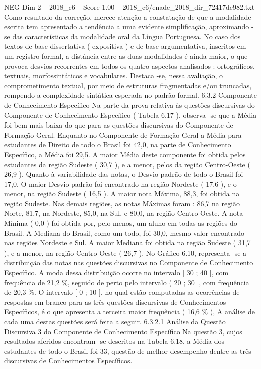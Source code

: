 \begin{textsample}{NEG Dim 2 – 2018\_c6 – Score 1.00 – 2018\_c6/enade\_2018\_dir\_72417de982.txt}
Como resultado da correção, merece atenção a constatação de que a modalidade escrita tem apresentado a tendência a uma evidente simplificação, aproximando -se das características da modalidade oral da Língua Portuguesa.
No caso dos textos de base dissertativa ( expositiva ) e de base argumentativa, inscritos em um registro formal, a distância entre as duas modalidades é ainda maior, o que provoca desvios recorrentes em todos os quatro aspectos analisados : ortográficos, textuais, morfossintáticos e vocabulares.
Destaca -se, nessa avaliação, o comprometimento textual, por meio de estruturas fragmentadas e/ou truncadas, rompendo a complexidade sintática esperada no padrão formal. 6.3.2 Componente de Conhecimento Específico Na parte da prova relativa às questões discursivas do Componente de Conhecimento Específico ( Tabela 6.17 ), observa -se que a Média foi bem mais baixa do que para as questões discursivas do Componente de Formação Geral.
Enquanto no Componente de Formação Geral a Média para estudantes de Direito de todo o Brasil foi 42,0, na parte de Conhecimento Específico, a Média foi 29,5.
A maior Média deste componente foi obtida pelos estudantes da região Sudeste ( 30,7 ), e a menor, pelos da região Centro-Oeste ( 26,9 ).
Quanto à variabilidade das notas, o Desvio padrão de todo o Brasil foi 17,0.
O maior Desvio padrão foi encontrado na região Nordeste ( 17,6 ), e o menor, na região Sudeste ( 16,5 ).
A maior nota Máxima, 88,3, foi obtida na região Sudeste.
Nas demais regiões, as notas Máximas foram : 86,7 na região Norte, 81,7, na Nordeste, 85,0, na Sul, e 80,0, na região Centro-Oeste.
A nota Mínima ( 0,0 ) foi obtida por, pelo menos, um aluno em todas as regiões do Brasil.
A Mediana do Brasil, como um todo, foi 30,0, mesmo valor encontrado nas regiões Nordeste e Sul.
A maior Mediana foi obtida na região Sudeste ( 31,7 ), e a menor, na região Centro-Oeste ( 26,7 ).
No Gráfico 6.10, representa -se a distribuição das notas nas questões discursivas no Componente de Conhecimento Específico.
A moda dessa distribuição ocorre no intervalo [ 30 ; 40 ], com frequência de 21,2 \%, seguido de perto pelo intervalo ( 20 ; 30 ], com frequência de 20,3 \%.
O intervalo [ 0 ; 10 ], no qual estão computadas as ocorrências de respostas em branco para as três questões discursivas de Conhecimentos Específicos, é o que apresenta a terceira maior frequência ( 16,6 \% ), A análise de cada uma destas questões será feita a seguir. 6.3.2.1 Análise da Questão Discursiva 3 do Componente de Conhecimento Específico Na questão 3, cujos resultados aferidos encontram -se descritos na Tabela 6.18, a Média dos estudantes de todo o Brasil foi 33, questão de melhor desempenho dentre as três discursivas de Conhecimentos Específicos.

\end{textsample}
